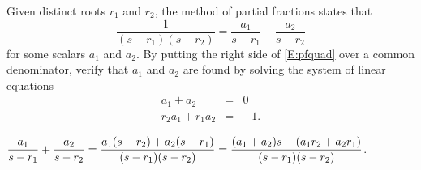 \documentclass{ximera}
\begin{document}
\begin{exercise}  \label{Ex:pf}
Given distinct roots $r_1$ and $r_2$, the method of partial fractions states 
that 
\begin{equation} \label{E:pfquad}
\frac{1}{(s-r_1)(s-r_2)} = \frac{a_1}{s-r_1} + \frac{a_2}{s-r_2}
\end{equation}
for some scalars $a_1$ and $a_2$.  By putting the right side of \eqref{E:pfquad}
over a common denominator, verify that $a_1$ and $a_2$ are found by solving 
the system of linear equations
\begin{eqnarray*}
a_1 + a_2 & = & 0\\
r_2a_1 + r_1a_2 & = & -1.
\end{eqnarray*}

\begin{solution}
$\displaystyle\frac{a_1}{s-r_1} + \frac{a_2}{s-r_2} = 
\frac{a_1(s-r_2)+a_2(s-r_1)}{(s-r_1)(s-r_2)} =
\frac{(a_1+a_2)s - (a_1r_2+a_2r_1)}{(s-r_1)(s-r_2)}$.


\end{solution}
\end{exercise}
\end{document}
